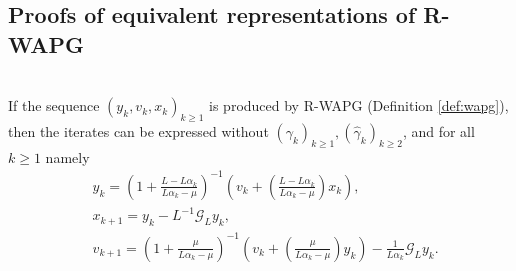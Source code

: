 \documentclass[12pt]{article}
\begin{document}
    \subsection{Proofs of equivalent representations of R-WAPG}
        \begin{proposition}\label{prop:wapg-first-equivalent-repr}\;\\
            If the sequence $(y_k, v_k, x_k)_{k \ge 1}$ is produced by R-WAPG (Definition \ref{def:wapg}), 
            then the iterates can be expressed without $(\gamma_k)_{k \ge1},(\hat \gamma_k)_{k \ge 2}$, and for all $k\ge 1$ namely
            \begin{align*}
                & 
                y_{k} = 
                \left(
                    1 + \frac{L - L\alpha_{k}}{L\alpha_{k} - \mu}
                \right)^{-1}
                \left(
                    v_{k} + 
                    \left(\frac{L - L\alpha_{k}}{L\alpha_{k} - \mu} \right) x_{k}
                \right), 
                \\
                & x_{k + 1} = 
                y_k - L^{-1} \mathcal G_L y_k, 
                \\
                & v_{k + 1} = 
                \left(
                    1 + \frac{\mu}{L \alpha_k - \mu}
                \right)^{-1}
                \left(
                    v_k + 
                    \left(\frac{\mu}{L \alpha_k - \mu}\right) y_k
                \right) - \frac{1}{L\alpha_{k}}\mathcal G_L y_k. 
            \end{align*}
        \end{proposition}
\end{document}

